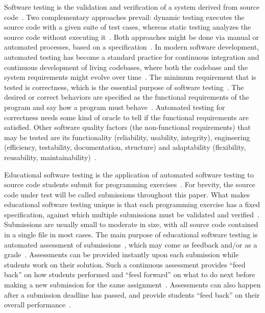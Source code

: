 \documentclass[../main]{subfiles}
\begin{document}
Software testing is the validation and verification of a system derived from source code~\autocite{ammannIntroductionSoftwareTesting2016}.
Two complementary approaches prevail: dynamic testing executes the source code with a given suite of test cases, whereas static testing analyzes the source code without executing it~\autocite{romliAutomaticProgrammingAssessment2010}.
Both approaches might be done via manual or automated processes, based on a specification~\autocite{pieterseAutomatedAssessmentProgramming2013}.
In modern software development, automated testing has become a standard practice for continuous integration and continuous development of living codebases, where both the codebase and the system requirements might evolve over time~\autocite{wintersSoftwareEngineeringGoogle2020}.
The minimum requirement that is tested is correctness, which is the essential purpose of software testing~\autocite{panSoftwareTesting1999}.
The desired or correct behaviors are specified as the functional requirements of the program and say how a program must behave~\autocite{bassSoftwareArchitecturePractice2021}.
Automated testing for correctness needs some kind of oracle to tell if the functional requirements are satisfied.
Other software quality factors (the non-functional requirements) that may be tested are its functionality (reliability, usability, integrity), engineering (efficiency, testability, documentation, structure) and adaptability (flexibility, reusability, maintainability)~\autocite{hetzelCompleteGuideSoftware1988}.

Educational software testing is the application of automated software testing to source code students submit for programming exercises~\autocite{staubitzRepositoryOpenAutogradable2017,paivaAutomatedAssessmentComputer2022,souzaSystematicLiteratureReview2016,keuningSystematicLiteratureReview2018}.
For brevity, the source code under test will be called submissions throughout this paper.
What makes educational software testing unique is that each programming exercise has a fixed specification, against which multiple submissions must be validated and verified~\autocite{wilcoxTestingStrategiesAutomated2016}.
Submissions are usually small to moderate in size, with all source code contained in a single file in most cases.
The main purpose of educational software testing is automated assessment of submissions~\autocite{berssanetteActiveLearningContext2021}, which may come as feedback and/or as a grade~\autocite{caizaProgrammingAssignmentsAutomatic2013}.
Assessments can be provided instantly upon each submission while students work on their solution.
Such a continuous assessment provides ``feed back'' on how students performed and ``feed forward'' on what to do next before making a new submission for the same assignment~\autocite{cheangAutomatedGradingProgramming2003,higginsCourseMarkerCBASystem2003,luckSecureOnlineSubmission1999}.
Assessments can also happen after a submission deadline has passed, and provide students ``feed back'' on their overall performance~\autocite{hattiePowerFeedback2007,timmisRethinkingAssessmentDigital2016}.
\end{document}
